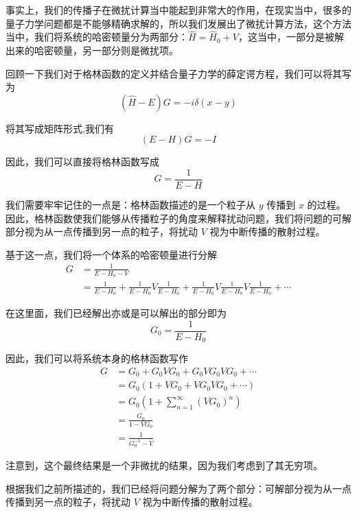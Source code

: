 事实上，我们的传播子在微扰计算当中能起到非常大的作用，在现实当中，很多的量子力学问题都是不能够精确求解的，所以我们发展出了微扰计算方法，这个方法当中，我们将系统的哈密顿量分为两部分：$\hat{H} = \hat{H}_0 + V$，这当中，一部分是被解出来的哈密顿量，另一部分则是微扰项。

回顾一下我们对于格林函数的定义并结合量子力学的薛定谔方程，我们可以将其写为
\begin{equation*}
    \left(\hat{H} - E\right) G = -i\delta(x - y)
\end{equation*}

将其写成矩阵形式,我们有 
\begin{equation*}
    \left(E - H\right)G = -I
\end{equation*}

因此，我们可以直接将格林函数写成
\begin{equation*}
    G = \frac{1}{E - H}
\end{equation*}

我们需要牢牢记住的一点是：格林函数描述的是一个粒子从 $y$ 传播到 $x$ 的过程。因此，格林函数使我们能够从传播粒子的角度来解释扰动问题，我们将问题的可解部分视为从一点传播到另一点的粒子，将扰动 $V$ 视为中断传播的散射过程。

基于这一点，我们将一个体系的哈密顿量进行分解
\begin{align*}
    G &= \frac{1}{E - H_0 - V} \\
    &= \frac{1}{E - H_0} + \frac{1}{E - H_0}V\frac{1}{E - H_0} + \frac{1}{E - H_0}V\frac{1}{E - H_0}V\frac{1}{E - H_0} + \cdots
\end{align*}

在这里面，我们已经解出亦或是可以解出的部分即为
\begin{equation*}
    G_0 = \frac{1}{E - H_0}
\end{equation*}

因此，我们可以将系统本身的格林函数写作
\begin{align*}
    G &= G_0 + G_0VG_0 + G_0VG_0VG_0 + \cdots\\
    &= G_0\left(1 + V G_0 + V G_0 V G_0 + \cdots\right) \\
    &= G_0\left(1 + \sum_{n = 1}^{\infty} (V G_0)^n\right) \\
    &= \frac{G_0}{1 - V G_0} \\
    &= \frac{1}{G_0^{-1} - V}
\end{align*}

注意到，这个最终结果是一个非微扰的结果，因为我们考虑到了其无穷项。

根据我们之前所描述的，我们已经将问题分解为了两个部分：可解部分视为从一点传播到另一点的粒子，将扰动 $V$ 视为中断传播的散射过程。

